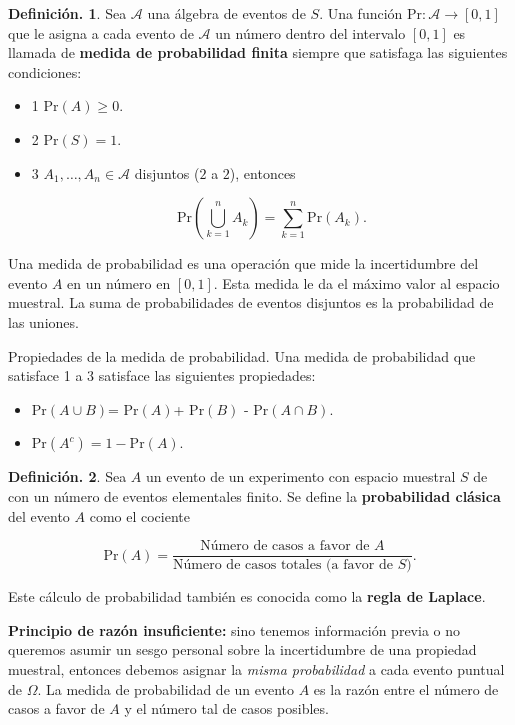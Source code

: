 \documentclass[]{book}
\providecommand{\tightlist}{%
  \setlength{\itemsep}{0pt}\setlength{\parskip}{0pt}}
\theoremstyle{definition}
\newtheorem{definition}{Definición.}[chapter]
\theoremstyle{definition}
\theoremstyle{definition}
\theoremstyle{remark}
\begin{document}
\begin{definition}
\protect\hypertarget{def:unnamed-chunk-91}{}{\label{def:unnamed-chunk-91} }
Sea \(\mathcal{A}\) una álgebra de eventos de \(S\). Una función \(\mbox{Pr}: \mathcal{A}\to [0,1]\) que le asigna a cada evento de \(\mathcal{A}\) un
número dentro del intervalo \([0,1]\) es llamada de \textbf{medida de
probabilidad finita} siempre que satisfaga las siguientes condiciones:

\begin{itemize}
\item
  1 \(\mbox{Pr}(A)\geq 0\).
\item
  2 \(\mbox{Pr}(S) =1\).
\item
  3 \(A_1,\ldots, A_n\in \mathcal{A}\) disjuntos (\(2\) a \(2\)), entonces

  \[ \mbox{Pr}\left(\bigcup_{k=1}^{n} A_k \right)=
  \sum_{k=1}^{n}\mbox{Pr}(A_k). \]
\end{itemize}
\end{definition}

Una medida de probabilidad es una operación que mide la incertidumbre del
evento \(A\) en un número en \([0,1]\). Esta medida le da el máximo valor
al espacio muestral. La suma de probabilidades de eventos disjuntos es la
probabilidad de las uniones.

Propiedades de la medida de probabilidad. Una medida de probabilidad que
satisface 1 a 3 satisface las siguientes propiedades:

\begin{itemize}
\tightlist
\item
  Pr\((A \cup B)\)= Pr\((A)\)+ \(\mbox{Pr}(B)\) - Pr\((A\cap B)\).
\item
  Pr\((A^c)= 1-\mbox{Pr}(A)\).
\end{itemize}

\begin{definition}
\protect\hypertarget{def:unnamed-chunk-92}{}{\label{def:unnamed-chunk-92} }
Sea \(A\) un evento de un experimento con espacio muestral \(S\) de
con un número de eventos elementales finito. Se define la \textbf{probabilidad
clásica} del evento \(A\) como
el cociente

\[\mbox{Pr}(A)=\frac{ \mbox{Número de casos a favor de } A}{ \mbox{Número
  de casos totales (a favor de $S$)}}.\]

Este cálculo de probabilidad también es conocida como la \textbf{regla de
Laplace}.
\end{definition}

\textbf{Principio de razón insuficiente:} sino tenemos información previa o no
queremos asumir un sesgo personal sobre la incertidumbre de una propiedad
muestral, entonces debemos asignar la \emph{misma probabilidad} a cada evento
puntual de \(\Omega\). La medida de probabilidad de un evento \(A\) es la razón
entre el número de casos a favor de \(A\) y el número tal de casos posibles.
\end{document}
